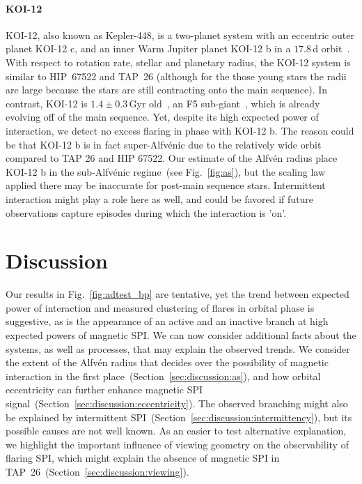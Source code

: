 \documentclass[twocolumn]{aastex631}
\begin{document}
\paragraph{KOI-12}
\label{sec:results:individualstars:koi12}
KOI-12, also known as Kepler-448, is a two-planet system with an eccentric outer planet KOI-12 c, and an inner Warm Jupiter planet KOI-12 b in a $17.8\,$d orbit~\citep{masuda2017eccentric}. With respect to rotation rate, stellar and planetary radius, the KOI-12 system is similar to HIP~67522 and TAP~26 (although for the those young stars the radii are large because the stars are still contracting onto the main sequence). In contrast, KOI-12 is $1.4\pm0.3\,$Gyr old~\citep{bourrier2015sophie}, an F5 sub-giant~\citep{frasca2016activity}, which is already evolving off of the main sequence. Yet, despite its high expected power of interaction, we detect no excess flaring in phase with KOI-12 b. The reason could be that KOI-12 b is in fact super-Alfv\'enic due to the relatively wide orbit compared to TAP 26 and HIP 67522. Our estimate of the Alfv\'en radius place KOI-12 b in the sub-Alfv\'enic regime~(see Fig.~\ref{fig:as}), but the scaling law applied there may be inaccurate for post-main sequence stars. Intermittent interaction might play a role here as well, and could be favored if future observations capture episodes during which the interaction is 'on'.




\section{Discussion}
\label{sec:discussion}

Our results in Fig.~\ref{fig:adtest_bp} are tentative, yet the trend between expected power of interaction and measured clustering of flares in orbital phase is suggestive, as is the appearance of an active and an inactive branch at high expected powers of magnetic SPI. We can now consider additional facts about the systems, as well as processes, that may explain the observed trends. We consider the extent of the Alfv\'en radius that decides over the possibility of magnetic interaction in the first place~(Section~\ref{sec:discussion:as}), and how orbital eccentricity can further enhance magnetic SPI signal~(Section~\ref{sec:discussion:eccentricity}). The observed branching might also be explained by intermittent SPI~(Section~\ref{sec:discussion:intermittency}), but its possible causes are not well known. As an easier to test alternative explanation, we highlight the important influence of viewing geometry on the observability of flaring SPI, which might explain the absence of magnetic SPI in TAP~26~(Section~\ref{sec:discussion:viewing}). 
\end{document}
